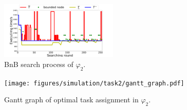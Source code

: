 \begin{figure}[htbp]
		\centering
\includegraphics[width =0.5\textwidth]{figures/simulation/task2/bnb_search3.pdf}
\caption{ BnB search process of $\varphi_2$.}
\label{fig:hesse_task2}
\end{figure}

\begin{figure}[htbp]
		\centering
\texttt{[image: figures/simulation/task2/gantt\_graph.pdf]}
\caption{Gantt graph of optimal task assignment in $\varphi_2$.}
\label{fig:gantt_task2}
\end{figure}

